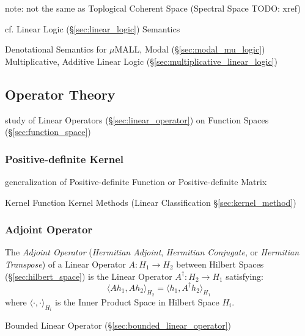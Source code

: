 note: not the same as Toplogical Coherent Space (Spectral Space TODO: xref)

cf. Linear Logic (\S\ref{sec:linear_logic}) Semantics

Denotational Semantics for $\mu$MALL, Modal (\S\ref{sec:modal_mu_logic})
Multiplicative, Additive Linear Logic (\S\ref{sec:multiplicative_linear_logic})




\subsection{Operator Theory}\label{sec:operator_theory}

study of Linear Operators (\S\ref{sec:linear_operator}) on Function Spaces
(\S\ref{sec:function_space})



\subsubsection{Positive-definite Kernel}\label{sec:pd_kernel}

generalization of Positive-definite Function or Positive-definite Matrix

Kernel Function \fist Kernel Methods (Linear Classification
\S\ref{sec:kernel_method})



\subsubsection{Adjoint Operator}\label{sec:adjoint_operator}

The \emph{Adjoint Operator} (\emph{Hermitian Adjoint}, \emph{Hermitian
  Conjugate}, or \emph{Hermitian Transpose}) of a Linear Operator $A : H_1
\rightarrow H_2$ between Hilbert Spaces (\S\ref{sec:hilbert_space}) is the
Linear Operator $A^\dag : H_2 \rightarrow H_1$ satisfying:
\[
  \langle{Ah_1,Ah_2}\rangle_{H_2} = \langle{h_1,A^{\dag}h_2}\rangle_{H_1}
\]
where $\langle\cdot,\cdot\rangle_{H_i}$ is the Inner Product Space in Hilbert
Space $H_i$.


Bounded Linear Operator (\S\ref{sec:bounded_linear_operator})

